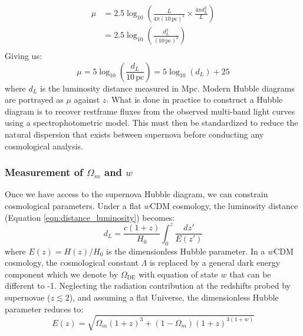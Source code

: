 \begin{align}
    \mu
    &= 2.5 \log_{10}\left(
    \frac{L}{4\pi (10\,\text{pc})^2}
    \times
    \frac{4\pi d_L^2}{L}
    \right)\\
    &= 2.5 \log_{10}\left(
    \frac{d_L^2}{(10\,\text{pc})^2}
    \right)\\
\end{align}
Giving us:
\begin{equation}
    \mu = 5 \log_{10}\left( \frac{d_L}{10 \, \text{pc}} \right) = 5\log_{10}(d_L) + 25
    \label{eqn:dL_mu}
\end{equation}
where $d_L$ is the luminosity distance measured in Mpc. Modern Hubble diagrams are portrayed as $\mu$ against $z$. What is done in practice to construct a Hubble diagram is to 
recover restframe fluxes from the observed multi-band light curves using a spectrophotometric model. This must then be standardized to reduce the natural dispersion that exists between 
supernova before conducting any cosmological analysis. 

\subsubsection{Measurement of $\Omega_m$ and $w$}

Once we have access to the supernova Hubble diagram, we can constrain cosmological parameters. Under a flat $w$CDM cosmology, the luminosity 
distance (Equation \ref{eqn:distance_luminosity}) becomes:
\begin{equation}
    d_L = \frac{c(1+z)}{H_0} \int_{0}^{z} \frac{dz'}{E(z')}
    \label{eqn:dL_w}
\end{equation}
where $E(z) = H(z)/H_0$ is the dimensionless Hubble parameter. In a $w$CDM cosmology, the cosmological constant $\Lambda$ is replaced by a 
general dark energy component which we denote by $\Omega_{\text{DE}}$ with equation of state 
$w$ that can be different to -1. Neglecting the radiation contribution 
at the redshifts probed by supernovae ($z \lesssim 2$), and assuming a 
flat Universe, the dimensionless Hubble parameter reduces to:
\begin{equation}
    E(z) = \sqrt{\Omega_m (1+z)^3 + (1-\Omega_m)(1+z)^{3(1+w)}}
\end{equation}

